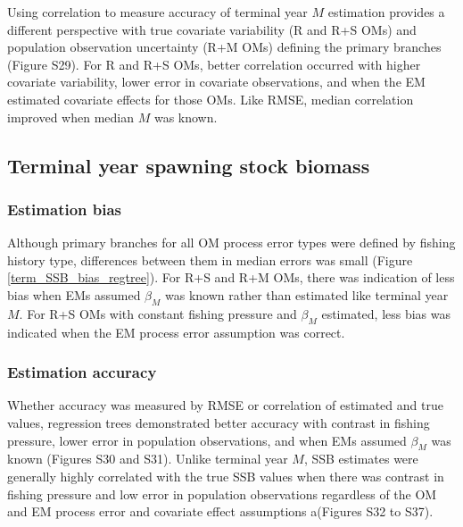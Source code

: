 \documentclass[
  12pt,
]{article}
\begin{document}
Using correlation to measure accuracy of terminal year \(M\) estimation
provides a different perspective with true covariate variability (R and
R+S OMs) and population observation uncertainty (R+M OMs) defining the
primary branches (Figure S29). For R and R+S OMs, better correlation
occurred with higher covariate variability, lower error in covariate
observations, and when the EM estimated covariate effects for those OMs.
Like RMSE, median correlation improved when median \(M\) was known.

\subsection*{Terminal year spawning stock
biomass}\label{terminal-year-spawning-stock-biomass}

\subsubsection*{Estimation bias}\label{estimation-bias-3}

Although primary branches for all OM process error types were defined by
fishing history type, differences between them in median errors was
small (Figure \ref{term_SSB_bias_regtree}). For R+S and R+M OMs, there
was indication of less bias when EMs assumed \(\beta_M\) was known
rather than estimated like terminal year \(M\). For R+S OMs with
constant fishing pressure and \(\beta_M\) estimated, less bias was
indicated when the EM process error assumption was correct.

\subsubsection*{Estimation accuracy}\label{estimation-accuracy-1}

Whether accuracy was measured by RMSE or correlation of estimated and
true values, regression trees demonstrated better accuracy with contrast
in fishing pressure, lower error in population observations, and when
EMs assumed \(\beta_M\) was known (Figures S30 and S31). Unlike terminal
year \(M\), SSB estimates were generally highly correlated with the true
SSB values when there was contrast in fishing pressure and low error in
population observations regardless of the OM and EM process error and
covariate effect assumptions a(Figures S32 to S37).
\end{document}
